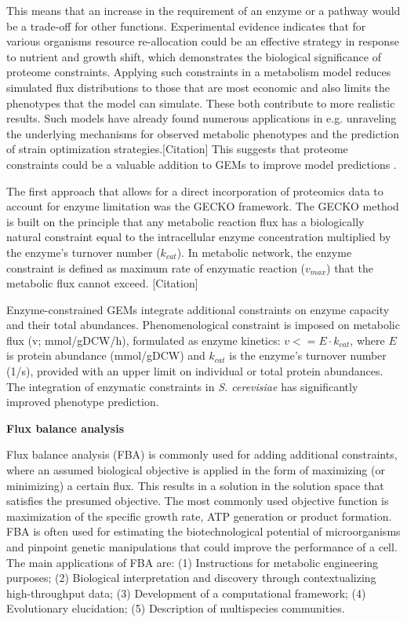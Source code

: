 This means that an increase in the requirement of an enzyme or a pathway would be a trade-off for other
functions. Experimental evidence indicates that for various organisms resource re-allocation could be an effective strategy 
in response to nutrient and growth shift, which demonstrates the biological significance 
of proteome constraints. \cite{Chen2023} 
Applying such constraints in a metabolism model reduces simulated flux distributions to those that are most 
economic and also limits the phenotypes that the model can simulate. These both contribute to more realistic results. 
Such models have already found numerous applications in e.g. unraveling the underlying mechanisms for observed metabolic 
phenotypes and the prediction of strain optimization strategies.[Citation] %
This suggests that proteome constraints could be a valuable addition to GEMs to
improve model predictions \cite{Chen2023}. 

The first approach that allows for a direct incorporation of proteomics data to account for enzyme limitation
was the GECKO framework. The GECKO method is built on the principle that any metabolic reaction flux has a
biologically natural constraint equal to the intracellular enzyme concentration multiplied by
the enzyme's turnover number ($k_{cat}$). In metabolic network, the enzyme constraint is
defined as maximum rate of enzymatic reaction ($v_{max}$) that the metabolic flux cannot exceed. [Citation] %

Enzyme-constrained GEMs integrate additional constraints on enzyme capacity and
their total abundances. Phenomenological constraint is imposed on metabolic flux (v; mmol/gDCW/h), formulated as enzyme
kinetics: $v <=  E \cdot k_{cat}$, where $E$ is protein abundance (mmol/gDCW) and $k_{cat}$ is the enzyme's turnover number (1/s),
provided with an upper limit on individual or total protein abundances. The integration of
enzymatic constraints in \textit{S. cerevisiae} has significantly improved phenotype prediction. \cite{Rekena2023}


\textbf{Flux balance analysis}


Flux balance analysis (FBA) is commonly used for adding additional constraints, where an
assumed biological objective is applied in the form of maximizing (or minimizing) a certain flux. This results in
a solution in the solution space that satisfies the presumed objective. The most commonly used objective function is maximization of the 
specific growth rate, ATP generation or product formation. FBA is often used for estimating the biotechnological potential of 
microorganisms and pinpoint genetic manipulations that could improve the performance of a cell. The main applications of 
FBA are:
(1) Instructions for metabolic engineering purposes;
(2) Biological interpretation and discovery through
contextualizing high-throughput data;
(3) Development of a computational framework;
(4) Evolutionary elucidation;
(5) Description of multispecies communities. \cite{Kerkhoven2014}

